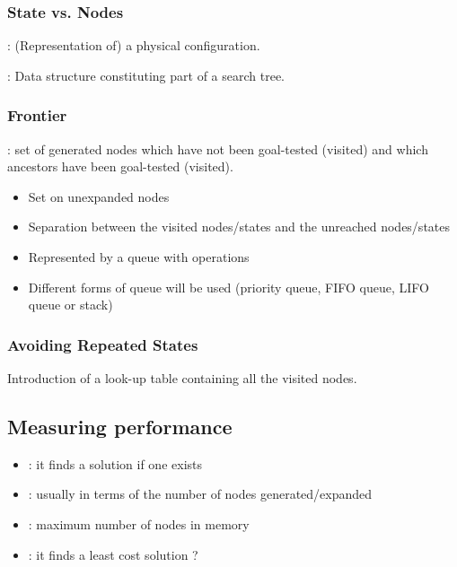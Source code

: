 \subsubsection{State vs. Nodes}

 : (Representation of) a physical configuration.

 : Data structure constituting part of a search tree.

\subsubsection{Frontier}

 : set of generated nodes which have not been goal-tested (visited) and which ancestors have been goal-tested (visited).

\begin{itemize}
\item Set on unexpanded nodes
\item Separation between the visited nodes/states and the unreached nodes/states
\item Represented by a queue with operations
\item Different forms of queue will be used (priority queue, FIFO queue, LIFO queue or stack)
\end{itemize}

\subsubsection{Avoiding Repeated States}

Introduction of a look-up table containing all the visited nodes.

\subsection{Measuring performance}

\begin{itemize}
\item {} : it finds a solution if one exists
\item {} : usually in terms of the number of nodes generated/expanded
\item {} : maximum number of nodes in memory
\item {} : it finds a least cost solution ?
\end{itemize}

